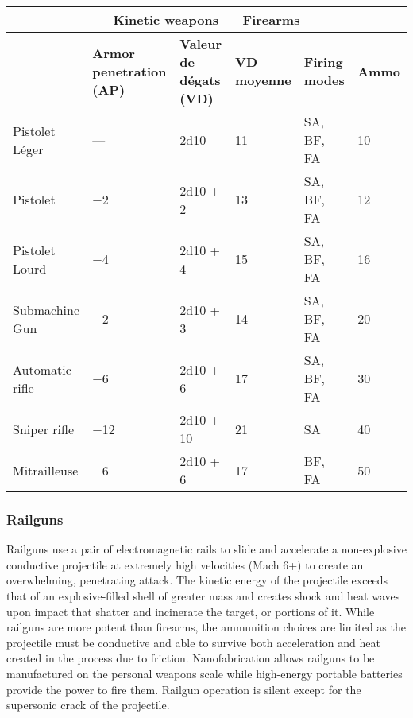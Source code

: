 \begin{table} \begin{tabularx}{\textwidth}{|l|X|X|X|l|l|} \hline

\multicolumn{6}{|c|}{\textbf{Kinetic weapons --- Firearms}} \\ \hline

&\textbf{Armor penetration (AP)}	&\textbf{Valeur de dégats (VD)}	&\textbf{VD moyenne}	&\textbf{Firing modes}	&\textbf{Ammo} \\ \hline

Pistolet Léger	&--- &2d10	&11	&SA, BF, FA	&10 \\ \hline

Pistolet	&$-$2	&2d10 + 2	&13	&SA, BF, FA	&12 \\ \hline

Pistolet Lourd	&$-$4	&2d10 + 4	&15	&SA, BF, FA	&16 \\ \hline

Submachine Gun	&$-$2	&2d10 + 3	&14	&SA, BF, FA	&20 \\ \hline

Automatic rifle	&$-$6	&2d10 + 6	&17	&SA, BF, FA	&30 \\ \hline

Sniper rifle	&$-$12	&2d10 + 10	&21	&SA	&40 \\ \hline

Mitrailleuse	&$-$6	&2d10 + 6	&17	&BF, FA	&50 \\ \hline

\end{tabularx} \label{tab:kinetic-firearms} \end{table} 

\subsubsection{Railguns} 

Railguns use a pair of electromagnetic rails to slide and accelerate a non-explosive conductive projectile at extremely high velocities (Mach 6+) to create an overwhelming, penetrating attack. The kinetic energy of the projectile exceeds that of an explosive-filled shell of greater mass and creates shock and heat waves upon impact that shatter and incinerate the target, or portions of it. While railguns are more potent than firearms, the ammunition choices are limited as the projectile must be conductive and able to survive both acceleration and heat created in the process due to friction. Nanofabrication allows railguns to be manufactured on the personal weapons scale while high-energy portable batteries provide the power to fire them. Railgun operation is silent except for the supersonic crack of the projectile. 

